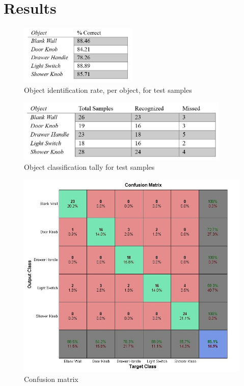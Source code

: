 \documentclass{article}
\begin{document}
\section{Results}
\begin{figure}[!b]
    \centering
    \includegraphics[width=0.5\textwidth]{Results_1.JPG}
    \caption{Object identification rate, per object, for test samples}
    \label{fig:results1}
\end{figure}
\begin{figure}[!t]
    \centering
    \includegraphics[width=0.9\textwidth]{Results_2.JPG}
    \caption{Object classification tally for test samples}
    \label{fig:results2}
\end{figure}
\begin{figure}[!t]
    \centering
    \includegraphics[width=.8\textwidth]{confusion.jpg}
    \caption{Confusion matrix}
    \label{fig:confusion}
\end{figure}
\end{document}
